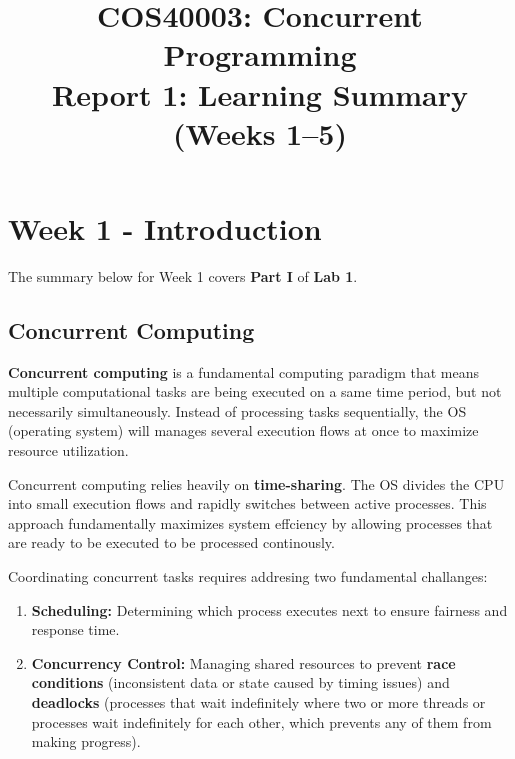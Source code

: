 \documentclass[conference]{IEEEtran}
\title{\textbf{COS40003: Concurrent Programming}\\
\Large Report 1: Learning Summary (Weeks 1--5)}
\author{\IEEEauthorblockN{Dang Duc Minh}
\IEEEauthorblockA{Student ID: 105559691}}
\begin{document}
\maketitle
\thispagestyle{plain}

\section{Week 1 - Introduction}

\noindent The summary below for Week 1 covers \textbf{Part I} of \textbf{Lab 1}.

\subsection{Concurrent Computing}
\textbf{Concurrent computing} is a fundamental computing paradigm that means multiple computational 
tasks are being executed on a same time period, but not necessarily 
simultaneously. Instead of processing tasks sequentially, the OS (operating system) will manages 
several execution flows at once to maximize resource utilization.

\hspace{5pt}

\noindent Concurrent computing relies heavily on \textbf{time-sharing}. The OS divides 
the CPU into small execution flows and rapidly switches between active processes. This approach
fundamentally maximizes system effciency by allowing processes that are ready to be executed to be
processed continously.

\hspace{5pt}

\noindent Coordinating concurrent tasks requires addresing two fundamental challanges:
 

\begin{enumerate}
    \item \textbf{Scheduling:} Determining which process executes next to ensure fairness and response time.
    \item \textbf{Concurrency Control:} Managing shared resources to prevent \textbf{race conditions} (inconsistent data or state caused by timing issues) and \textbf{deadlocks} (processes that wait indefinitely where two or more threads or processes wait indefinitely for each other, which prevents any of them from making progress).
\end{enumerate}
\end{document}
